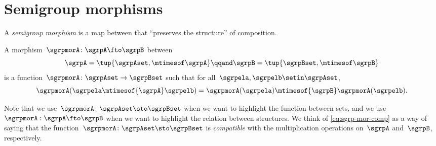 

\section{Semigroup morphisms}
\label{sec:semigroup-morphisms}



A \emph{semigroup morphism} is a map between  that ``preserves the structure'' of composition.


\begin{marginfigure}
    \centering
    \caption{Semigroup Morphism}
    \label{fig:semigroup-morphism-diagram}
\end{marginfigure}

\begin{ctdefinition}
    \label{def:semigroup-mor}
    A morphism~$\sgrpmorA\colon \sgrpA \fto \sgrpB$ between  \begin{equation}
        \label{eq:sgrpAB}
        \sgrpA = \tup{\sgrpAset, \mtimesof\sgrpA}
        \qqand
        \sgrpB = \tup{\sgrpBset, \mtimesof\sgrpB}
    \end{equation}
    is a function~$\sgrpmorA\colon \sgrpAset \to \sgrpBset$ such that for all~$\sgrpela, \sgrpelb \setin \sgrpAset$,
    \begin{equation}
        \label{eq:sgrp-mor-comp}
        \sgrpmorA(\sgrpela \mtimesof{\sgrpA} \sgrpelb) = \sgrpmorA (\sgrpela) \mtimesof{\sgrpB} \sgrpmorA(\sgrpelb).
    \end{equation}
\end{ctdefinition}

Note that we use~$\sgrpmorA\colon \sgrpAset \sto \sgrpBset$ when we want to highlight the function between sets, and we use~$\sgrpmorA: \sgrpA \fto \sgrpB$ when we want to highlight the relation between  structures.
We think of \cref{eq:sgrp-mor-comp} as a way of saying that the function~$\sgrpmorA\colon \sgrpAset \sto \sgrpBset$ is \emph{compatible} with the multiplication operations on~$\sgrpA$ and~$\sgrpB$, respectively.

